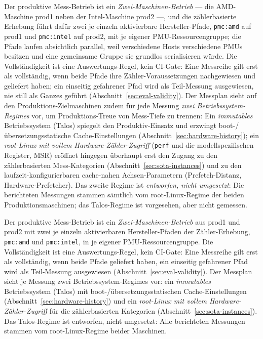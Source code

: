 \begin{nurlang}
Der produktive Mess-Betrieb ist ein \emph{Zwei-Maschinen-Betrieb} --- die AMD-Maschine prod1 neben
der Intel-Maschine prod2 ---, und die zählerbasierte Erhebung führt dafür zwei je einzeln
aktivierbare Hersteller-Pfade, \texttt{pmc:amd} auf prod1 und \texttt{pmc:intel} auf prod2, mit je
eigener PMU-Ressourcengruppe; die Pfade laufen absichtlich parallel, weil verschiedene Hosts
verschiedene PMUs besitzen und eine gemeinsame Gruppe sie grundlos serialisieren würde. Die
Vollständigkeit ist eine Auswertungs-Regel, kein CI-Gate: Eine Messreihe gilt erst als vollständig,
wenn beide Pfade ihre Zähler-Voraussetzungen nachgewiesen und geliefert haben; ein einseitig
gefahrener Pfad wird als Teil-Messung ausgewiesen, nie still als Ganzes geführt
(Abschnitt~\ref{sec:eval-validity}). Der Messplan sieht auf den Produktions-Zielmaschinen zudem für jede Messung
\emph{zwei Betriebssystem-Regimes} vor, um Produktions-Treue von Mess-Tiefe zu trennen: Ein
\emph{immutables} Betriebssystem (Talos) spiegelt den Produktiv-Einsatz und erzwingt
boot-/übersetzungsstatische Cache-Einstellungen (Abschnitt~\ref{sec:hardware-history}); ein
\emph{root-Linux mit vollem Hardware-Zähler-Zugriff} (\texttt{perf} und die modellspezifischen
Register, MSR) eröffnet hingegen überhaupt erst den Zugang zu den zählerbasierten Mess-Kategorien
(Abschnitt~\ref{sec:sota-instances}) und zu den laufzeit-konfigurierbaren cache-nahen
Achsen-Parametern (Prefetch-Distanz, Hardware-Prefetcher). Das zweite Regime ist \emph{entworfen,
nicht umgesetzt}: Die berichteten Messungen stammen sämtlich vom root-Linux-Regime der beiden
Produktionsmaschinen; das Talos-Regime ist vorgesehen, aber nicht gemessen.
\end{nurlang}
\begin{nurkurz}
Der produktive Mess-Betrieb ist ein \emph{Zwei-Maschinen-Betrieb} aus prod1 und prod2 mit zwei je einzeln
aktivierbaren Hersteller-Pfaden der Zähler-Erhebung, \texttt{pmc:amd} und \texttt{pmc:intel}, in je
eigener PMU-Ressourcengruppe. Die Vollständigkeit ist eine Auswertungs-Regel, kein CI-Gate: Eine Messreihe
gilt erst als vollständig, wenn beide Pfade geliefert haben, ein einseitig gefahrener Pfad wird als
Teil-Messung ausgewiesen (Abschnitt~\ref{sec:eval-validity}). Der Messplan sieht je Messung zwei
Betriebssystem-Regimes vor: ein \emph{immutables} Betriebssystem (Talos) mit boot-/übersetzungsstatischen
Cache-Einstellungen (Abschnitt~\ref{sec:hardware-history}) und ein \emph{root-Linux mit vollem
Hardware-Zähler-Zugriff} für die zählerbasierten Kategorien (Abschnitt~\ref{sec:sota-instances}). Das
Talos-Regime ist
entworfen, nicht umgesetzt: Alle berichteten Messungen stammen vom root-Linux-Regime beider Maschinen.
\end{nurkurz}


